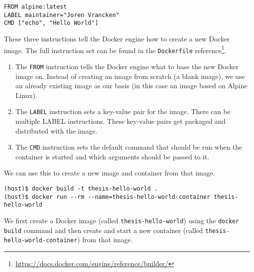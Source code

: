 \begin{lstlisting}[caption={Very Basic \lstinline{Dockerfile}.},label={listing:dockerfile-simple},captionpos=b]
FROM alpine:latest
LABEL maintainer="Joren Vrancken"
CMD ["echo", "Hello World"]
\end{lstlisting}

These three instructions tell the Docker engine how to create a new Docker image.
The full instruction set can be found in the \lstinline{Dockerfile} reference\footnote{\url{https://docs.docker.com/engine/reference/builder/}}.

\begin{enumerate}
    \item The \lstinline{FROM} instruction tells the Docker engine what to base the new Docker image on. Instead of creating an image from scratch (a blank image), we use an already existing image as our basis (in this case an image based on Alpine Linux).

    \item The \lstinline{LABEL} instruction sets a key-value pair for the image. There can be multiple LABEL instructions. These key-value pairs get packaged and distributed with the image.

    \item The \lstinline{CMD} instruction sets the default command that should be run when the container is started and which arguments should be passed to it.
\end{enumerate}

We can use this to create a new image and container from that image.
\begin{lstlisting}[caption={Creating a Docker container from a \lstinline{Dockerfile}.},label={listing:create-container},captionpos=b]
(host)$ docker build -t thesis-hello-world .
(host)$ docker run --rm --name=thesis-hello-world-container thesis-hello-world
\end{lstlisting}

We first create a Docker image (called \lstinline{thesis-hello-world}) using the \lstinline{docker build} command and then create and start a new container (called \lstinline{thesis-hello-world-container}) from that image.
